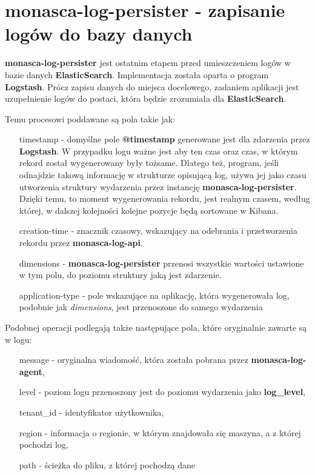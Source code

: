 \section{monasca-log-persister - zapisanie logów do bazy danych}
\label{chapter:monasca:monasca_log_persister}

\textbf{monasca-log-persister} jest ostatnim etapem przed umieszczeniem logów w bazie danych \textbf{ElasticSearch}.
Implementacja została oparta o program \textbf{Logstash}. Prócz zapisu danych do miejsca docelowego, zadaniem
aplikacji jest uzupełnienie logów do postaci, która będzie zrozumiała dla \textbf{ElasticSearch}. 


Temu procesowi poddawane są pola takie jak:
\begin{itemize}
    \item[timestamp] - domyślne pole \textbf{@timestamp} generowane jest dla zdarzenia przez \textbf{Logstash}. W przypadku
    logu ważne jest aby ten czas oraz czas, w którym rekord został wygenerowany były tożsame. Dlatego też, program, jeśli
    odnajdzie takową informację w strukturze opisującą log, używa jej jako czasu utworzenia struktury wydarzenia przez instancję
    \textbf{monasca-log-persister}. Dzięki temu, to moment wygenerowania rekordu, jest realnym czasem, według której, w dalszej
    kolejności kolejne pozycje będą sortowane w Kibana.
    \item[creation-time] - znacznik czasowy, wskazujący na odebrania i przetworzenia rekordu przez \textbf{monasca-log-api}.
    \item[dimensions] - \textbf{monasca-log-persister} przenosi wszystkie wartości ustawione w tym polu, do poziomu struktury
    jaką jest zdarzenie.
    \item[application-type] - pole wskazujące na aplikację, która wygenerowała log, podobnie jak \textit{dimensions}, jest przenoszone
    do samego wydarzenia
\end{itemize}

Podobnej operacji podlegają także następujące pola, które oryginalnie zawarte są w logu:
\begin{itemize}
    \item[message] - oryginalna wiadomość, która została pobrana przez \textbf{monasca-log-agent},
    \item[level] - poziom logu przenoszony jest do poziomu wydarzenia jako \textbf{log\_level},
    \item[tenant\_id] - identyfikator użytkownika,
    \item[region] - informacja o regionie, w którym znajdowała się maszyna, a z której pochodzi log,
    \item[path] - ścieżka do pliku, z której pochodzą dane
\end{itemize}
